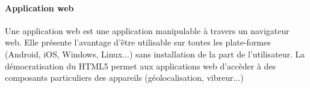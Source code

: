 \paragraph{Application web}
Une application web est une application manipulable à travers un navigateur web. Elle présente l'avantage d'être utilisable sur toutes les plate-formes (Android, iOS, Windows, Linux...) sans installation de la part de l'utilisateur. La démocratisation du HTML5 permet aux applications web d'accèder à des composants particuliers des appareils (géolocalisation, vibreur...)

